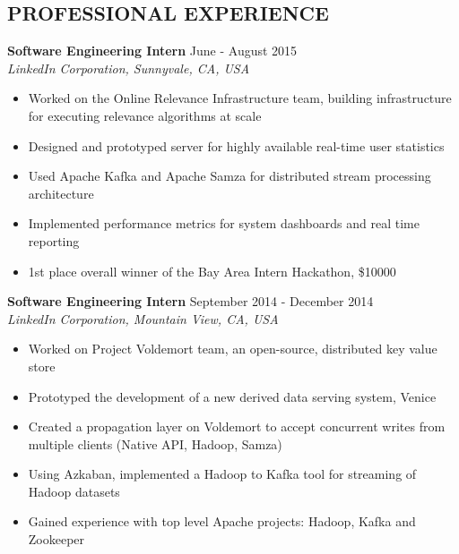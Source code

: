 \documentclass[10pt]{res} %
\begin{document}
\begin{resume}
 
\vspace{0.2in} %


\section{PROFESSIONAL EXPERIENCE} 

\vspace{0.2in} %

\textbf{Software Engineering Intern} \hfill June - August 2015 \\
{\sl LinkedIn Corporation, Sunnyvale, CA, USA }
\begin{itemize}  %
    \item Worked on the Online Relevance Infrastructure team, building infrastructure for executing relevance algorithms at scale 
    \item Designed and prototyped server for highly available real-time user statistics
    \item Used Apache Kafka and Apache Samza for distributed stream processing architecture
    \item Implemented performance metrics for system dashboards and real time reporting
    \item 1st place overall winner of the Bay Area Intern Hackathon, \$10000
\end{itemize}

\textbf{Software Engineering Intern} \hfill September 2014 - December 2014 \\[2pt]
{\sl LinkedIn Corporation, Mountain View, CA, USA} 
\begin{itemize}  %
    \item Worked on Project Voldemort team, an open-source, distributed key value store
    \item Prototyped the development of a new derived data serving system, Venice
    \item Created a propagation layer on Voldemort to accept concurrent writes from multiple clients (Native API, Hadoop, Samza)
    \item Using Azkaban, implemented a Hadoop to Kafka tool for streaming of Hadoop datasets
    \item Gained experience with top level Apache projects: Hadoop, Kafka and Zookeeper
\end{itemize}
 

\end{resume}
\end{document}

